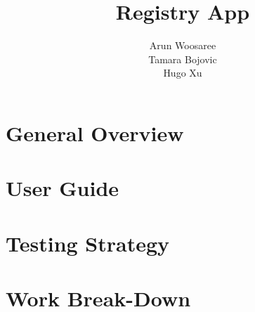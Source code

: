 \documentclass[letterpaper]{article}
\title{Registry App}
\author{Arun Woosaree\\
          Tamara Bojovic\\
          Hugo Xu}
\begin{document}
\maketitle %

\section{General Overview}


\section{User Guide}


\section{Testing Strategy}


\section{Work Break-Down}

\end{document}
